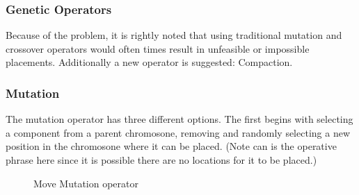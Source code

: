 \documentclass{article}
\begin{document}
\subsubsection{Genetic Operators}
Because of the problem, it is rightly noted that using traditional mutation and crossover operators would often times result in unfeasible or impossible placements. Additionally a new operator is suggested: Compaction. 

\subsubsection{Mutation}
The mutation operator has three different options. The first begins with selecting a component from a parent chromosone, removing and randomly selecting a new position in the chromosone where it can be placed. (Note can is the operative phrase here since it is possible there are no locations for it to be placed.) 

\begin{figure}[ht]
\centering
{}
\caption{Move Mutation operator}
\end{figure}
\end{document}
